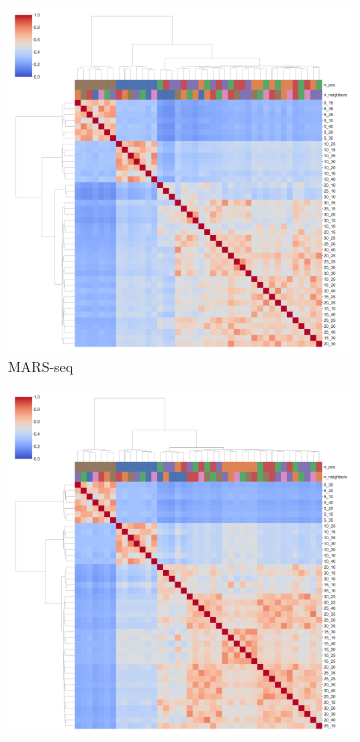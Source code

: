 \documentclass[11pt, titlepage, twoside]{article}
\begin{document}
\begin{figure}[H]
    \begin{subfigure}[t]{0.3\textwidth}
        \centering
        \includegraphics[width=\textwidth]{ClusterMap_L0_Panel3.pdf} 
        \caption{MARS-seq} \label{cm_mars}
    \end{subfigure}
   \hfill
    \begin{subfigure}[t]{0.3\textwidth}
        \centering
        \includegraphics[width=\textwidth]{ClusterMap_L0_Panel4.pdf} 

\end{subfigure}
\end{figure}
\end{document}
